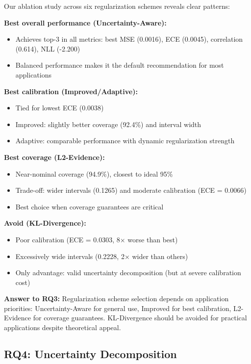 Our ablation study across six regularization schemes reveals clear patterns:

\textbf{Best overall performance (Uncertainty-Aware):}
\begin{itemize}
\item Achieves top-3 in all metrics: best MSE (0.0016), ECE (0.0045), correlation (0.614), NLL (-2.200)
\item Balanced performance makes it the default recommendation for most applications
\end{itemize}

\textbf{Best calibration (Improved/Adaptive):}
\begin{itemize}
\item Tied for lowest ECE (0.0038)
\item Improved: slightly better coverage (92.4\%) and interval width
\item Adaptive: comparable performance with dynamic regularization strength
\end{itemize}

\textbf{Best coverage (L2-Evidence):}
\begin{itemize}
\item Near-nominal coverage (94.9\%), closest to ideal 95\%
\item Trade-off: wider intervals (0.1265) and moderate calibration (ECE = 0.0066)
\item Best choice when coverage guarantees are critical
\end{itemize}

\textbf{Avoid (KL-Divergence):}
\begin{itemize}
\item Poor calibration (ECE = 0.0303, 8× worse than best)
\item Excessively wide intervals (0.2228, 2× wider than others)
\item Only advantage: valid uncertainty decomposition (but at severe calibration cost)
\end{itemize}

\textbf{Answer to RQ3:} Regularization scheme selection depends on application priorities: Uncertainty-Aware for general use, Improved for best calibration, L2-Evidence for coverage guarantees. KL-Divergence should be avoided for practical applications despite theoretical appeal.

\subsection{RQ4: Uncertainty Decomposition}

